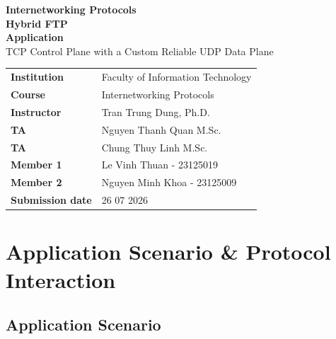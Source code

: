 \documentclass[11pt,a4paper]{article}
\begin{document}
\begin{titlepage}
\thispagestyle{empty}
\vspace*{13mm}
{\color{white}\sffamily\Large\textbf{Internetworking Protocols}}\\[2mm]


\vspace{42mm}
{\sffamily\color{Navy}\fontsize{30}{36}\selectfont\textbf{Hybrid FTP\\Application}}\\[6mm]
{\large\color{InkMuted}\sffamily TCP Control Plane with a Custom Reliable UDP Data Plane}

\vfill
\begin{tabularx}{\textwidth}{@{}P{39mm}Y@{}}
\toprule
\textbf{Institution} & Faculty of Information Technology \\
\textbf{Course} & Internetworking Protocols \\
\textbf{Instructor} & Tran Trung Dung, Ph.D. \\
\textbf{TA} & Nguyen Thanh Quan M.Sc. \\
\textbf{TA} & Chung Thuy Linh M.Sc. \\
\textbf{Member 1} & Le Vinh Thuan - 23125019 \\
\textbf{Member 2} & Nguyen Minh Khoa - 23125009 \\
\textbf{Submission date} & 26 07 2026 \\
\bottomrule
\end{tabularx}

\vspace{10mm}
\end{titlepage}

\tableofcontents
\clearpage
{}

\section{Application Scenario \& Protocol Interaction}

\subsection{Application Scenario}
\end{document}
